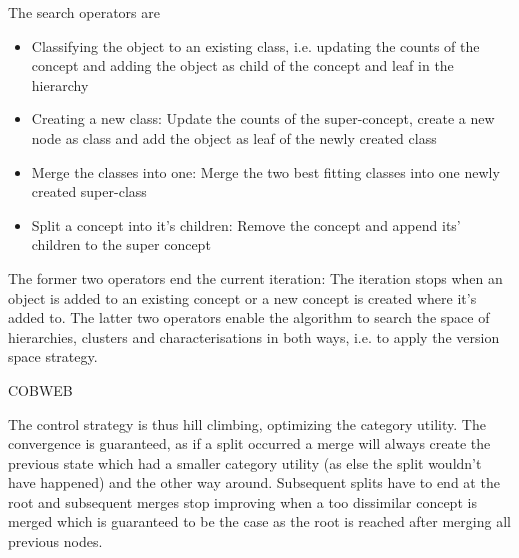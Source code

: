 The search operators are 
\begin{itemize}
    \item Classifying the object to an existing class, i.e. updating the counts of the concept and adding the object as child of the concept and leaf in the hierarchy
    \item Creating a new class: Update the counts of the super-concept, create a new node as class and add the object as leaf of the newly created class
    \item Merge the classes into one: Merge the two best fitting classes into one newly created super-class
    \item Split a concept into it's children: Remove the concept and append its' children to the super concept
\end{itemize}
The former two operators end the current iteration: The iteration stops when an object is added to an existing concept or a new concept is created where it's added to. The latter two operators enable the algorithm to search the space of hierarchies, clusters and characterisations in both ways, i.e. to apply the version space strategy.

\begin{algorithm}[htp]
    \hrulealg
\caption{COBWEB}\label{cobweb}
\end{algorithm}

The control strategy is thus hill climbing, optimizing the category utility. The convergence is guaranteed, as if a split occurred a merge will always create the previous state which had a smaller category utility (as else the split wouldn't have happened) and the other way around. Subsequent splits have to end at the root and subsequent merges stop improving when a too dissimilar concept is merged which is guaranteed to be the case as the root is reached after merging all previous nodes. \\

